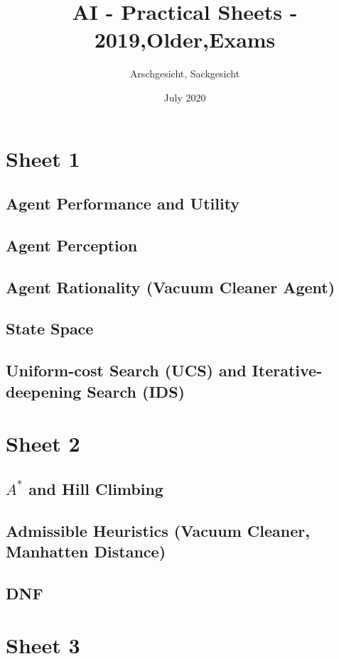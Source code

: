 \documentclass{article}
\title{AI - Practical Sheets - 2019,Older,Exams}
\author{Arschgesicht, Sackgesicht}
\date{July 2020}
\begin{document}
\maketitle

\tableofcontents
\newpage


\section{Sheet 1}
    \subsection{Agent Performance and Utility}
    \subsection{Agent Perception}
    \subsection{Agent Rationality (Vacuum Cleaner Agent)}
    \subsection{State Space}
    \subsection{Uniform-cost Search (UCS) and Iterative-deepening Search (IDS)}
    

\section{Sheet 2}
    \subsection{$A^*$ and Hill Climbing} 
    \subsection{Admissible Heuristics (Vacuum Cleaner, Manhatten Distance)}
    \subsection{DNF}
    
    
\section{Sheet 3}
\end{document}
